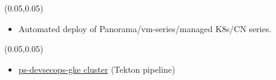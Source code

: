 \documentclass[aspectratio=169]{beamer}
\begin{document}
\begin{frame}{}
    \setlength{\TPHorizModule}{\textwidth}
    \setlength{\TPVertModule}{\textwidth}
    \begin{textblock}{0.74}(0.05,0.05)
        \bfseries\large{}
    \end{textblock}
    \begin{itemize}
        \item Automated deploy of Panorama/vm-series/managed K8s/CN series.    
    \end{itemize}
\end{frame}

\begin{frame}{}
    \setlength{\TPHorizModule}{\textwidth}
    \setlength{\TPVertModule}{\textwidth}
    \begin{textblock}{0.74}(0.05,0.05)
        \bfseries\large{}
    \end{textblock}
    \begin{itemize}
        \item \href{https://github.com/devsecfranklin/gke-cluster}{ps-devsecops-gke cluster} (Tekton pipeline)

    \end{itemize}
\end{frame}
\end{document}
